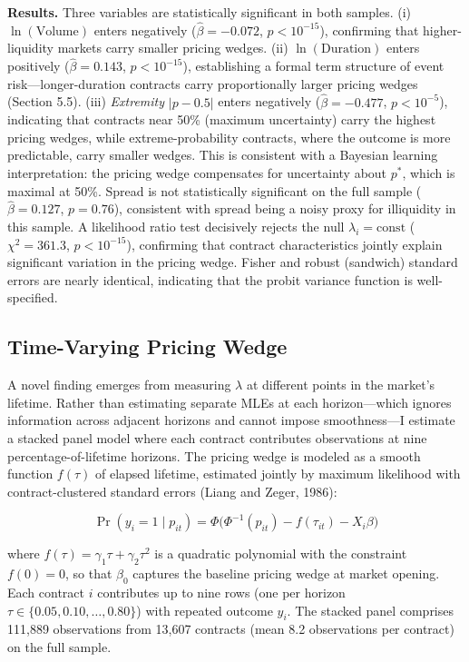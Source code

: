 \documentclass[12pt,a4paper]{article}
\begin{document}
\textbf{Results.} Three variables are statistically significant in both
samples. (i) \(\ln(\text{Volume})\) enters negatively
(\(\hat{\beta} = -0.072\), \(p < 10^{-15}\)), confirming that
higher-liquidity markets carry smaller pricing wedges. (ii)
\(\ln(\text{Duration})\) enters positively (\(\hat{\beta} = 0.143\),
\(p < 10^{-15}\)), establishing a formal term structure of event
risk---longer-duration contracts carry proportionally larger pricing
wedges (Section 5.5). (iii) \textit{Extremity} \(|p - 0.5|\) enters
negatively (\(\hat{\beta} = -0.477\), \(p < 10^{-5}\)), indicating that
contracts near 50\% (maximum uncertainty) carry the highest pricing
wedges, while extreme-probability contracts, where the outcome is more
predictable, carry smaller wedges. This is consistent with a Bayesian
learning interpretation: the pricing wedge compensates for uncertainty
about \(p^*\), which is maximal at 50\%. Spread is not statistically
significant on the full sample (\(\hat{\beta} = 0.127\), \(p = 0.76\)),
consistent with spread being a noisy proxy for illiquidity in this
sample. A likelihood ratio test decisively rejects the null
\(\lambda_i = \text{const}\) (\(\chi^2 = 361.3\), \(p < 10^{-15}\)),
confirming that contract characteristics jointly explain significant
variation in the pricing wedge. Fisher and robust (sandwich) standard
errors are nearly identical, indicating that the probit variance
function is well-specified.

\subsection{Time-Varying Pricing
Wedge}\label{time-varying-pricing-wedge}

A novel finding emerges from measuring \(\lambda\) at different points
in the market's lifetime. Rather than estimating separate MLEs at each
horizon---which ignores information across adjacent horizons and cannot
impose smoothness---I estimate a stacked panel model where each contract
contributes observations at nine percentage-of-lifetime horizons. The
pricing wedge is modeled as a smooth function \(f(\tau)\) of elapsed
lifetime, estimated jointly by maximum likelihood with
contract-clustered standard errors (Liang and Zeger, 1986):

\[\Pr(y_i = 1 \mid p_{it}) = \Phi\!\bigl(\Phi^{-1}(p_{it}) - f(\tau_{it}) - X_i\beta\bigr)\]

where \(f(\tau) = \gamma_1 \tau + \gamma_2 \tau^2\) is a quadratic
polynomial with the constraint \(f(0) = 0\), so that \(\beta_0\)
captures the baseline pricing wedge at market opening. Each contract
\(i\) contributes up to nine rows (one per horizon
\(\tau \in \{0.05, 0.10, \ldots, 0.80\}\)) with repeated outcome
\(y_i\). The stacked panel comprises 111,889 observations from 13,607
contracts (mean 8.2 observations per contract) on the full sample.
\end{document}
